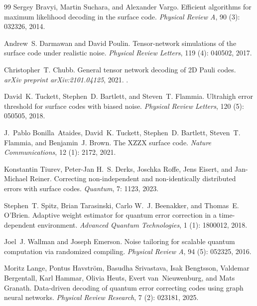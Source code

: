\documentclass[reprint,aps,prxquantum,amsmath,amssymb,floatfix,nofootinbib,longbibliography]{revtex4-2}
\theoremstyle{definition}
\theoremstyle{remark}
\theoremstyle{plain}
\begin{document}
\begin{thebibliography}{99}
Sergey Bravyi, Martin Suchara, and Alexander Vargo.
\newblock Efficient algorithms for maximum likelihood decoding in the surface
  code.
\newblock \emph{Physical Review A}, 90 (3): 032326, 2014.

Andrew~S. Darmawan and David Poulin.
\newblock Tensor-network simulations of the surface code under realistic noise.
\newblock \emph{Physical Review Letters}, 119 (4): 040502,
  2017.

Christopher~T. Chubb.
\newblock General tensor network decoding of {2D} {Pauli} codes.
\newblock \emph{arXiv preprint arXiv:2101.04125}, 2021.
\newblock {}.

David~K. Tuckett, Stephen~D. Bartlett, and Steven~T. Flammia.
\newblock Ultrahigh error threshold for surface codes with biased noise.
\newblock \emph{Physical Review Letters}, 120 (5): 050505,
  2018.

J.~Pablo Bonilla~Ataides, David~K. Tuckett, Stephen~D. Bartlett, Steven~T.
  Flammia, and Benjamin~J. Brown.
\newblock The {XZZX} surface code.
\newblock \emph{Nature Communications}, 12 (1): 2172, 2021.

Konstantin Tiurev, Peter-Jan H.~S. Derks, Joschka Roffe, Jens Eisert, and
  Jan-Michael Reiner.
\newblock Correcting non-independent and non-identically distributed errors with
  surface codes.
\newblock \emph{Quantum}, 7: 1123, 2023.

Stephen~T. Spitz, Brian Tarasinski, Carlo W.~J. Beenakker, and Thomas~E.
  O'Brien.
\newblock Adaptive weight estimator for quantum error correction in a
  time-dependent environment.
\newblock \emph{Advanced Quantum Technologies}, 1 (1):
  1800012, 2018.

Joel~J. Wallman and Joseph Emerson.
\newblock Noise tailoring for scalable quantum computation via randomized
  compiling.
\newblock \emph{Physical Review A}, 94 (5): 052325, 2016.

Moritz Lange, Pontus Havstr{\"o}m, Basudha Srivastava, Isak Bengtsson, Valdemar
  Bergentall, Karl Hammar, Olivia Heuts, Evert van~Nieuwenburg, and Mats
  Granath.
\newblock Data-driven decoding of quantum error correcting codes using graph
  neural networks.
\newblock \emph{Physical Review Research}, 7 (2): 023181,
  2025.


\end{thebibliography}
\end{document}
